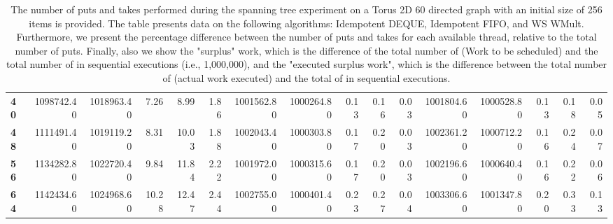 \begin{table}[!ht]
{\begin{tabular}{lrrrrrrrrrrrrrrr}
\textbf{40} &       1098742.40 & 1018963.40 &           7.26 &        8.99 &                 1.86 &      1001562.80 & 1000264.80 &           0.13 &        0.16 &                 0.03 & 1001804.60 & 1000528.80 &           0.13 &        0.18 &                 0.05 \\
\textbf{48} &       1111491.40 & 1019119.20 &           8.31 &       10.03 &                 1.88 &      1002043.40 & 1000303.80 &           0.17 &        0.20 &                 0.03 & 1002361.20 & 1000712.20 &           0.16 &        0.24 &                 0.07 \\
\textbf{56} &       1134282.80 & 1022720.40 &           9.84 &       11.84 &                 2.22 &      1001972.00 & 1000315.60 &           0.17 &        0.20 &                 0.03 & 1002196.60 & 1000640.40 &           0.16 &        0.22 &                 0.06 \\
\textbf{64} &       1142434.60 & 1024968.60 &          10.28 &       12.47 &                 2.44 &      1002755.00 & 1000401.40 &           0.23 &        0.27 &                 0.04 & 1003306.60 & 1001347.80 &           0.20 &        0.33 &                 0.13 \\
\bottomrule
\end{tabular}}
\label{difference-Torus_2D_60_directed-256-IDEMPOTENT_DEQUE-IDEMPOTENT_FIFO-WS_NC_MULT_OPT}
\caption{The number of puts and takes performed during the
    spanning tree experiment on a Torus 2D 60 directed graph with an initial size
    of 256 items is provided. The table presents data on the
    following algorithms: Idempotent DEQUE, Idempotent FIFO, and
    WS WMult. Furthermore, we present the percentage difference
    between the number of puts and takes for each available thread,
    relative to the total number of puts. Finally, also we show the
    "surplus" work, which is the difference of the total number of
    \Puts (Work to be scheduled) and the total number of \Puts in
    sequential executions (i.e., 1,000,000), and the "executed surplus
    work", which is the difference between the total number of \Takes
    (actual work executed) and the total of \Takes in sequential
    executions.}
\end{table}
